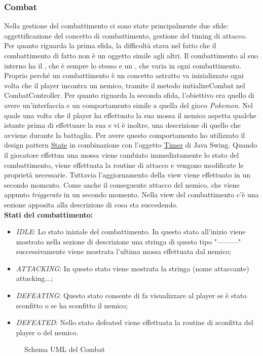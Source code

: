 \documentclass[a4paper,12pt]{report}
\begin{document}
\subsubsection{Combat}
Nella gestione del combattimento ci sono state principalmente due sfide: oggettificazione del concetto di combattimento, gestione del timing di attacco.
Per quanto riguarda la prima sfida, la difficoltà stava nel fatto che il combattimento di fatto non è un oggetto simile agli altri. Il combattimento al suo interno ha il \textit{}, che è sempre lo stesso e un \textit{}, che varia in ogni combattimento. Proprio perché un combattimento è un concetto astratto va inizializzato ogni volta che il player incontra un nemico, tramite il metodo initializeCombat nel CombatController.
Per quanto riguarda la seconda sfida, l'obiettivo era quello di avere un'interfaccia e un comportamento simile a quella del gioco \textit{Pokemon}. Nel quale una volta che il player ha effettuato la sua mossa il nemico aspetta qualche istante prima di effettuare la sua e vi è inoltre, una descrizione di quello che avviene durante la battaglia.
Per avere questo comportamento ho utilizzato il design pattern \href{https://refactoring.guru/design-patterns/state}{State} in combinazione con l'oggetto \href{https://docs.oracle.com/javase/8/docs/api/javax/swing/Timer.html}{Timer} di Java Swing. Quando il giocatore effettua una mossa viene cambiato immediatamente lo stato del combattimento, viene effettuata la routine di attacco e vengono modificate le proprietà necessarie. Tuttavia l'aggiornamento della view viene effettuato in un secondo momento. Come anche il conseguente attacco del nemico, che viene appunto \textit{triggerato} in un secondo momento.
Nella view del combattimento c'è una sezione apposita alla descrizione di cosa sta succedendo.\\
\textbf{Stati del combattimento:}
\begin{itemize}
	\item \textit{IDLE}: Lo stato iniziale del combattimento. In questo stato all'inizio viene mostrato nella sezione di descrizione una stringa di questo tipo "---------" successivamente viene mostrata l'ultima mossa effettuata dal nemico;
	\item \textit{ATTACKING}: In questo stato viene mostrata la stringa (nome attaccante) attacking...;
	\item \textit{DEFEATING}: Questo stato consente di fa visualizzare al player se è stato sconfitto o se ha sconfitto il nemico;
	\item \textit{DEFEATED}: Nello stato defeated viene effettuata la routine di sconfitta del player o del nemico.
\end{itemize}
\begin{figure}[H]
	\centering
	
	\caption{Schema UML del Combat}
	\label{fig:the-exiled-combat-uml}
\end{figure}
\end{document}
